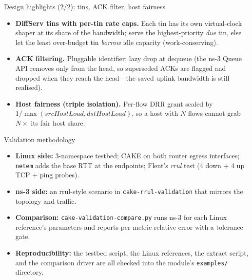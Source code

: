 \documentclass[10pt,aspectratio=169]{beamer}
\begin{document}
\begin{frame}{Design highlights (2/2): tins, ACK filter, host fairness}
\begin{itemize}
  \item \textbf{DiffServ tins with per-tin rate caps.} Each tin has its own
        virtual-clock shaper at its share of the bandwidth; serve the
        highest-priority \emph{due} tin, else let the least over-budget tin
        \emph{borrow} idle capacity (work-conserving).
  \item \textbf{ACK filtering.} Pluggable identifier; lazy drop at dequeue
        (the ns-3 Queue API removes only from the head, so superseded ACKs
        are flagged and dropped when they reach the head---the saved uplink
        bandwidth is still realised).
  \item \textbf{Host fairness (triple isolation).} Per-flow DRR grant scaled
        by $1/\max(\textit{srcHostLoad}, \textit{dstHostLoad})$, so a host
        with $N$ flows cannot grab $N\times$ its fair host share.
\end{itemize}
\end{frame}

\begin{frame}{Validation methodology}
\begin{itemize}
  \item \textbf{Linux side:} 3-namespace testbed; CAKE on both router egress
        interfaces; \texttt{netem} adds the base RTT at the endpoints;
        Flent's \emph{rrul} test (4 down + 4 up TCP + ping probes).
  \item \textbf{ns-3 side:} an rrul-style scenario in
        \texttt{cake-rrul-validation} that mirrors the topology and traffic.
  \item \textbf{Comparison:} \texttt{cake-validation-compare.py} runs ns-3
        for each Linux reference's parameters and reports per-metric relative
        error with a tolerance gate.
  \item \textbf{Reproducibility:} the testbed script, the Linux references,
        the extract script, and the comparison driver are all checked into
        the module's \texttt{examples/} directory.
\end{itemize}
\end{frame}
\end{document}
